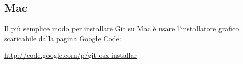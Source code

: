 \subsection{Mac}
Il più semplice modo per installare Git su Mac è usare l'installatore grafico scaricabile dalla pagina Google Code:

\begin{center}
\url{http://code.google.com/p/git-osx-installar}
\end{center}